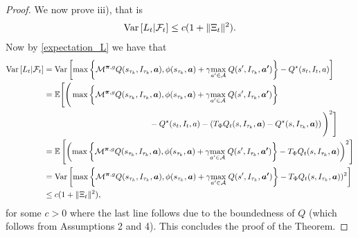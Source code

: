 \documentclass{article}
\begin{document}
\begin{proof}
We now prove iii), that is
\begin{align}
    {\rm Var}\left[L_t|\mathcal{F}_t\right]\leq c(1+\|\Xi_t\|^2).
\end{align}
Now by \eqref{expectation_L} we have that
\begin{align*}
  {\rm Var}\left[L_t|\mathcal{F}_t\right]&= {\rm Var}\left[\max\left\{\mathcal{M}^{\boldsymbol{\pi},g}Q(s_{\tau_k},I_{\tau_k},\boldsymbol{a}), \phi(s_{\tau_k},\boldsymbol{a})+\gamma\underset{a'\in\mathcal{A}}{\max}\;Q(s',I_{\tau_k},\boldsymbol{a'})\right\}-Q^\star(s_t,I_t,a)\right]
  \\&= \mathbb{E}\Bigg[\Bigg(\max\left\{\mathcal{M}^{\boldsymbol{\pi},g}Q(s_{\tau_k},I_{\tau_k},\boldsymbol{a}), \phi(s_{\tau_k},\boldsymbol{a})+\gamma\underset{a'\in\mathcal{A}}{\max}\;Q(s',I_{\tau_k},\boldsymbol{a'})\right\}
  \\&\qquad\qquad\qquad\qquad\qquad\quad\quad\quad-Q^\star(s_t,I_t,a)-\left(T_\Phi Q_t(s,I_{\tau_k},\boldsymbol{a})-Q^\star(s,I_{\tau_k},\boldsymbol{a})\right)\Bigg)^2\Bigg]
      \\&= \mathbb{E}\left[\left(\max\left\{\mathcal{M}^{\boldsymbol{\pi},g}Q(s_{\tau_k},I_{\tau_k},\boldsymbol{a}), \phi(s_{\tau_k},\boldsymbol{a})+\gamma\underset{a'\in\mathcal{A}}{\max}\;Q(s',I_{\tau_k},\boldsymbol{a'})\right\}-T_\Phi Q_t(s,I_{\tau_k},\boldsymbol{a})\right)^2\right]
    \\&= {\rm Var}\left[\max\left\{\mathcal{M}^{\boldsymbol{\pi},g}Q(s_{\tau_k},I_{\tau_k},\boldsymbol{a}), \phi(s_{\tau_k},\boldsymbol{a})+\gamma\underset{a'\in\mathcal{A}}{\max}\;Q(s',I_{\tau_k},\boldsymbol{a'})\right\}-T_\Phi Q_t(s,I_{\tau_k},\boldsymbol{a}))^2\right]
    \\&\leq c(1+\|\Xi_t\|^2),
\end{align*}
for some $c>0$ where the last line follows due to the boundedness of $Q$ (which follows from Assumptions 2 and 4). This concludes the proof of the Theorem.
\end{proof}
\end{document}
